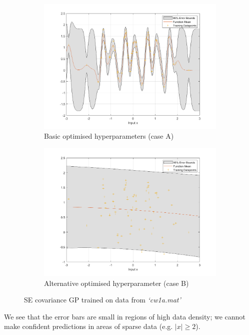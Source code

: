 \documentclass[]{article}
\begin{document}
\begin{figure}[!h]
	\begin{subfigure}{0.5\linewidth}
		\centering
		\includegraphics[width=\linewidth]{1a}
		\caption{Basic optimised hyperparameters (case A)}
		\label{fig:1a}
	\end{subfigure}
	\begin{subfigure}{0.5\linewidth}
		\centering
		\includegraphics[width=\linewidth]{1b}
		\caption{Alternative optimised hyperparameter (case B)}
		\label{fig:1b}
	\end{subfigure}
	\caption{SE covariance GP trained on data from \textit{`cw1a.mat'}}
	\label{fig:1}
\end{figure}

We see that the error bars are small in regions of high data density; we cannot make confident predictions in areas of sparse data (e.g. $|x| \geq 2$).
\end{document}

